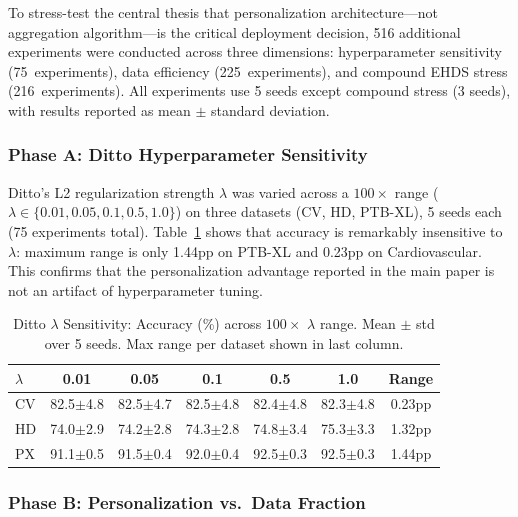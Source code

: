 \documentclass[conference]{IEEEtran}
\begin{document}
To stress-test the central thesis that personalization architecture---not aggregation algorithm---is the critical deployment decision, 516 additional experiments were conducted across three dimensions: hyperparameter sensitivity (75~experiments), data efficiency (225~experiments), and compound EHDS stress (216~experiments). All experiments use 5 seeds except compound stress (3 seeds), with results reported as mean $\pm$ standard deviation.

\subsubsection{Phase A: Ditto Hyperparameter Sensitivity}
\label{sec:thesis_phase_a}

Ditto's L2 regularization strength $\lambda$ was varied across a $100\times$ range ($\lambda \in \{0.01, 0.05, 0.1, 0.5, 1.0\}$) on three datasets (CV, HD, PTB-XL), 5 seeds each (75 experiments total). Table~\ref{tab:ditto_lambda} shows that accuracy is remarkably insensitive to $\lambda$: maximum range is only 1.44pp on PTB-XL and 0.23pp on Cardiovascular. This confirms that the personalization advantage reported in the main paper is not an artifact of hyperparameter tuning.

\begin{table}[htbp]
\centering
\caption{Ditto $\lambda$ Sensitivity: Accuracy (\%) across $100\times$ $\lambda$ range. Mean $\pm$ std over 5 seeds. Max range per dataset shown in last column.}
\label{tab:ditto_lambda}
\small
\begin{tabular}{lccccc|c}
\toprule
\textbf{$\lambda$} & \textbf{0.01} & \textbf{0.05} & \textbf{0.1} & \textbf{0.5} & \textbf{1.0} & \textbf{Range} \\
\midrule
CV & 82.5$\pm$4.8 & 82.5$\pm$4.7 & 82.5$\pm$4.8 & 82.4$\pm$4.8 & 82.3$\pm$4.8 & 0.23pp \\
HD & 74.0$\pm$2.9 & 74.2$\pm$2.8 & 74.3$\pm$2.8 & 74.8$\pm$3.4 & 75.3$\pm$3.3 & 1.32pp \\
PX & 91.1$\pm$0.5 & 91.5$\pm$0.4 & 92.0$\pm$0.4 & 92.5$\pm$0.3 & 92.5$\pm$0.3 & 1.44pp \\
\bottomrule
\end{tabular}
\end{table}

\subsubsection{Phase B: Personalization vs.\ Data Fraction}
\label{sec:thesis_phase_b}
\end{document}
